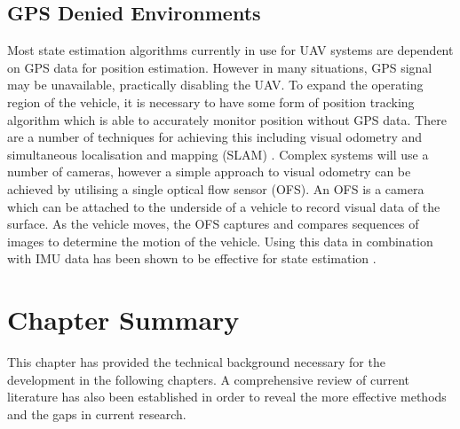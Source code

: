 \subsection{GPS Denied Environments}
Most state estimation algorithms currently in use for UAV systems are dependent on GPS data for position estimation. However in many situations, GPS signal may be unavailable, practically disabling the UAV. To expand the operating region of the vehicle, it is necessary to have some form of position tracking algorithm which is able to accurately monitor position without GPS data. There are a number of techniques for achieving this including visual odometry and simultaneous localisation and mapping (SLAM) \cite{Balamurugan2016}. Complex systems will use a number of cameras, however a simple approach to visual odometry can be achieved by utilising a single optical flow sensor (OFS). An OFS is a camera which can be attached to the underside of a vehicle to record visual data of the surface. As the vehicle moves, the OFS captures and compares sequences of images to determine the motion of the vehicle. Using this data in combination with IMU data has been shown to be effective for state estimation \cite{Driessen2018}. 

\section{Chapter Summary}
This chapter has provided the technical background necessary for the development in the following chapters. A comprehensive review of current literature has also been established in order to reveal the more effective methods and the gaps in current research.



\clearpage


